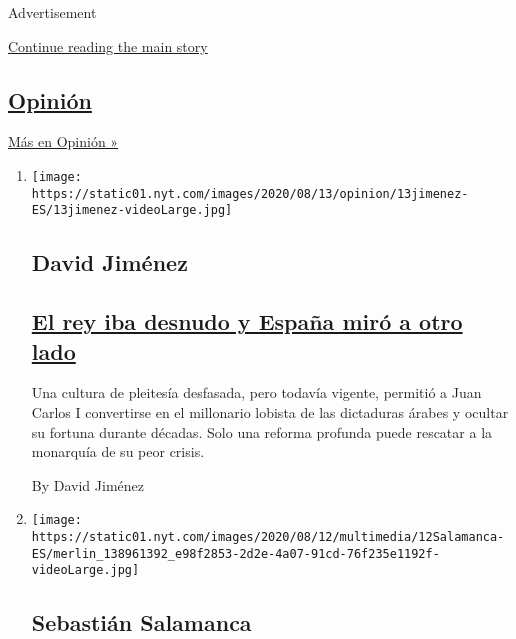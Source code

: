 Advertisement

\protect\hyperlink{after-mid1}{Continue reading the main story}

\hypertarget{opiniuxf3n}{%
\subsection{\texorpdfstring{\href{/es/section/opinion}{Opinión}}{Opinión}}\label{opiniuxf3n}}

\href{/es/section/opinion}{Más en Opinión »}

\begin{enumerate}
\def\labelenumi{\arabic{enumi}.}
\item
  \texttt{[image: https://static01.nyt.com/images/2020/08/13/opinion/13jimenez-ES/13jimenez-videoLarge.jpg]}

  \hypertarget{david-jimuxe9nez}{%
  \subsection{David Jiménez}\label{david-jimuxe9nez}}

  \hypertarget{el-rey-iba-desnudo-y-espauxf1a-miruxf3-a-otro-lado}{%
  \subsection{\texorpdfstring{\href{/es/2020/08/13/espanol/opinion/rey-juan-carlos-exilio-corrupcion.html}{El
  rey iba desnudo y España miró a otro
  lado}}{El rey iba desnudo y España miró a otro lado}}\label{el-rey-iba-desnudo-y-espauxf1a-miruxf3-a-otro-lado}}

  Una cultura de pleitesía desfasada, pero todavía vigente, permitió a
  Juan Carlos I convertirse en el millonario lobista de las dictaduras
  árabes y ocultar su fortuna durante décadas. Solo una reforma profunda
  puede rescatar a la monarquía de su peor crisis.

  By David Jiménez
\item
  \texttt{[image: https://static01.nyt.com/images/2020/08/12/multimedia/12Salamanca-ES/merlin\_138961392\_e98f2853-2d2e-4a07-91cd-76f235e1192f-videoLarge.jpg]}

  \hypertarget{sebastiuxe1n-salamanca}{%
  \subsection{Sebastián Salamanca}\label{sebastiuxe1n-salamanca}}

  \hypertarget{es-hora-de-acabar-con-la-verdad-oficial-en-muxe9xico}{%
}
\end{enumerate}
